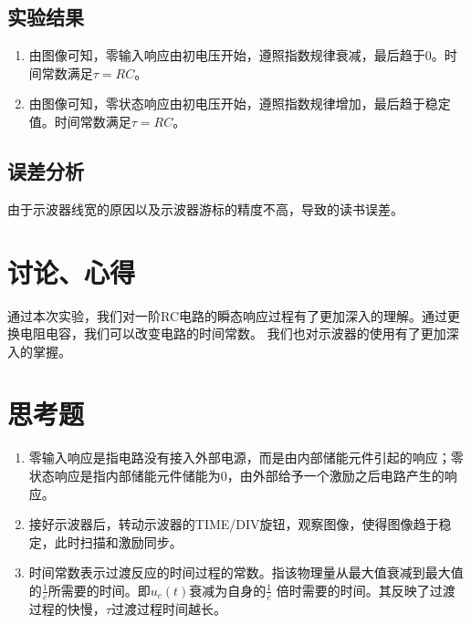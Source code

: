 \documentclass{../source/Experiment}
\begin{document}
    \subsection{实验结果}
            \begin{enumerate}
                \item 由图像可知，零输入响应由初电压开始，遵照指数规律衰减，最后趋于0。时间常数满足$\tau =RC$。
                \item 由图像可知，零状态响应由初电压开始，遵照指数规律增加，最后趋于稳定值。时间常数满足$\tau =RC$。
            \end{enumerate}
    \subsection{误差分析}
        由于示波器线宽的原因以及示波器游标的精度不高，导致的读书误差。
    \section{讨论、心得}
        通过本次实验，我们对一阶RC电路的瞬态响应过程有了更加深入的理解。通过更换电阻电容，我们可以改变电路的时间常数。
        我们也对示波器的使用有了更加深入的掌握。
    \section{思考题}
        \begin{enumerate}
            \item 零输入响应是指电路没有接入外部电源，而是由内部储能元件引起的响应；零状态响应是指内部储能元件储能为0，由外部给予一个激励之后电路产生的响应。
            \item 接好示波器后，转动示波器的TIME/DIV旋钮，观察图像，使得图像趋于稳定，此时扫描和激励同步。
            \item 时间常数表示过渡反应的时间过程的常数。指该物理量从最大值衰减到最大值的$\frac{1}{e} $所需要的时间。即$u_c(t)$衰减为自身的$\frac{1}{e} $ 倍时需要的时间。其反映了过渡过程的快慢，$\tau $过渡过程时间越长。
        \end{enumerate}
\end{document}
